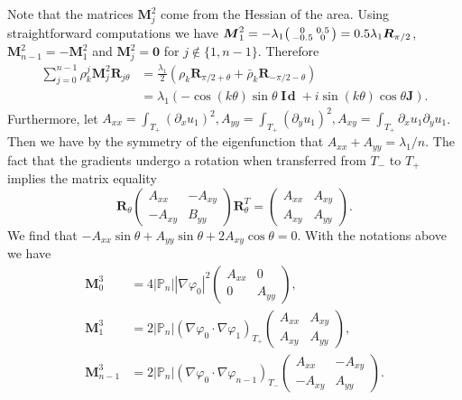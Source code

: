 \documentclass[JEP,XML,SOM,Unicode,ThmDefs,NoFloatCountersInSection,published]{cedram}
\newenvironment{smallpmatrix}{\big(\begin{smallmatrix}}{\end{smallmatrix}\big)}
\theoremstyle{plain}
\theoremstyle{definition}
\newcommand{\bo}[1]{{\boldsymbol#1}}
\newcommand{\Id}{\operatorname{{\bo I\!\bo d}}}
\def\Pp{{\mathbb{P}_n}}
\begin{document}
Note that the matrices $\bo M_j^2$ come from the Hessian of the area. Using straightforward computations we have $\bo M_1^2 = -\lambda_1 \begin{smallpmatrix}
0 & 0.5 \\
-0.5 & 0
\end{smallpmatrix}=0.5\lambda_1 \bo R_{\pi/2}$, $\bo M_{n-1}^2 = -\bo M_1^2$ and $\bo M_j^2 = \bo 0$ for $j\notin\{1,n-1\}$. Therefore
\begin{align*}
\sum_{j=0}^{n-1} \rho_k^j\bo M_j^2 \bo R_{j\theta} &= \frac{\lambda_1}{2} (\rho_k\bo R_{\pi/2+\theta}+\bar \rho_k \bo R_{-\pi/2-\theta})\\
&=\lambda_1 (-\cos(k\theta) \sin \theta \Id+ i \sin(k\theta) \cos \theta \bo J).
\end{align*}
Furthermore, let $A_{xx} = \int_{T_+} (\partial_x u_1)^2, A_{yy} = \int_{T_+} (\partial_y u_1)^2, A_{xy} = \int_{T_+} \partial_x u_1 \partial_y u_1$. Then we have by the symmetry of the eigenfunction that $A_{xx}+A_{yy} = \lambda_1/n$. The fact that the gradients undergo a rotation when transferred from $T_-$ to $T_+$ implies the matrix equality
\begin{equation}
\bo R_\theta\begin{pmatrix}
A_{xx} & -A_{xy} \\
-A_{xy} & B_{yy}
\end{pmatrix}
\bo R_\theta^T
=
\begin{pmatrix}
A_{xx} & A_{xy} \\
A_{xy} & A_{yy}
\end{pmatrix}.
\label{eq:relation-rotation-gradients}
\end{equation}
We find that $-A_{xx}\sin \theta + A_{yy} \sin \theta + 2A_{xy} \cos \theta = 0$. With the notations above we have
\begin{align*}
\bo M_0^3 &= 4 |\Pp| |\nabla \varphi_0|^2 \begin{pmatrix}
A_{xx} & 0 \\
0 & A_{yy}
\end{pmatrix},\\
\bo M_1^3 &= 2 |\Pp| (\nabla \varphi_0 \cdot \nabla \varphi_1)_{T_+} \begin{pmatrix}
A_{xx} & A_{xy} \\
A_{xy} & A_{yy}
\end{pmatrix},
\\
\bo M_{n-1}^3 &= 2 |\Pp| (\nabla \varphi_0 \cdot \nabla \varphi_{n-1})_{T_-} \begin{pmatrix}
A_{xx} & -A_{xy} \\
-A_{xy} & A_{yy}
\end{pmatrix}.
\end{align*}
\end{document}
